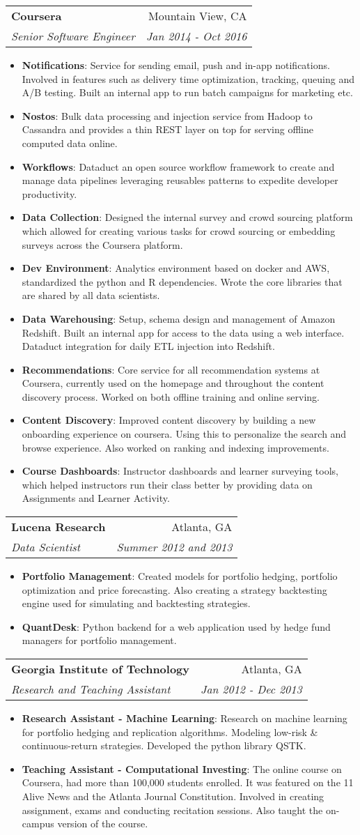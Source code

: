 \documentclass[letterpaper,11pt]{article}
\makeatletter
\newcommand{\resumeItem}[2]{
  \item\small{
    \textbf{#1}{: #2 \vspace{-2pt}}
  }
}
\newcommand{\resumeSubheading}[4]{
  \vspace{-1pt}\item
    \begin{tabular*}{0.97\textwidth}[t]{l@{\extracolsep{\fill}}r}
      \textbf{#1} & #2 \\
      \textit{\small#3} & \textit{\small #4} \\
    \end{tabular*}\vspace{-5pt}
}
\newcommand{\resumeItemListStart}{\begin{itemize}}
\newcommand{\resumeItemListEnd}{\end{itemize}\vspace{-5pt}}
\makeatother
\begin{document}
\resumeSubheading
{Coursera}{Mountain View, CA}
{Senior Software Engineer}{Jan 2014 - Oct 2016}
\resumeItemListStart
\resumeItem{Notifications}
{Service for sending email, push and in-app notifications. Involved in features such as delivery time optimization, tracking, queuing and A/B testing. Built an internal app to run batch campaigns for marketing etc.}
\resumeItem{Nostos}
{Bulk data processing and injection service from Hadoop to Cassandra and provides a thin REST layer on top for serving offline computed data online.}
\resumeItem{Workflows}
{Dataduct an open source workflow framework to create and manage data pipelines leveraging reusables patterns to expedite developer productivity.}
\resumeItem{Data Collection}
{Designed the internal survey and crowd sourcing platform which allowed for creating various tasks for crowd sourcing or embedding surveys across the Coursera platform.}
\resumeItem{Dev Environment}
{Analytics environment based on docker and AWS, standardized the python and R dependencies. Wrote the core libraries that are shared by all data scientists.}
\resumeItem{Data Warehousing}
{Setup, schema design and management of Amazon Redshift. Built an internal app for access to the data using a web interface. Dataduct integration for daily ETL injection into Redshift.}
\resumeItem{Recommendations}
{Core service for all recommendation systems at Coursera, currently used on the homepage and throughout the content discovery process. Worked on both offline training and online serving.}
\resumeItem{Content Discovery}
{Improved content discovery by building a new onboarding experience on coursera. Using this to personalize the search and browse experience. Also worked on ranking and indexing improvements.}
\resumeItem{Course Dashboards}
{Instructor dashboards and learner surveying tools, which helped instructors run their class better by providing data on Assignments and Learner Activity.}
\resumeItemListEnd

\resumeSubheading
{Lucena Research}{Atlanta, GA}
{Data Scientist}{Summer 2012 and 2013}
\resumeItemListStart
\resumeItem{Portfolio Management}
{Created models for portfolio hedging,  portfolio optimization and price forecasting. Also creating a strategy backtesting engine used for simulating and backtesting strategies.}
\resumeItem{QuantDesk}
{Python backend for a web application used by hedge fund managers for portfolio management.}
\resumeItemListEnd

\resumeSubheading
{Georgia Institute of Technology}{Atlanta, GA}
{Research and Teaching Assistant}{Jan 2012 - Dec 2013}
\resumeItemListStart
\resumeItem{Research Assistant - Machine Learning}
{Research on machine learning for portfolio hedging and replication algorithms. Modeling low-risk \& continuous-return strategies. Developed the python library QSTK.}
\resumeItem{Teaching Assistant - Computational Investing}
{The online course on Coursera, had more than 100,000 students enrolled. It was featured on the 11 Alive News and the Atlanta Journal Constitution. Involved in creating assignment, exams and conducting recitation sessions. Also taught the on-campus version of the course.}
\resumeItemListEnd
\end{document}
